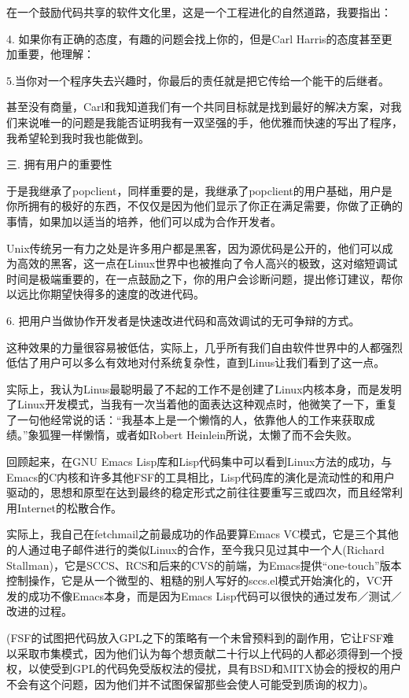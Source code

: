 \documentclass[a4paper,12pt,UTF8,twoside]{ctexbook}
\begin{document}
在一个鼓励代码共享的软件文化里，这是一个工程进化的自然道路，我要指出：

4. 如果你有正确的态度，有趣的问题会找上你的，但是Carl Harris的态度甚至更加重要，他理解：

5.当你对一个程序失去兴趣时，你最后的责任就是把它传给一个能干的后继者。


甚至没有商量，Carl和我知道我们有一个共同目标就是找到最好的解决方案，对我们来说唯一的问题是我能否证明我有一双坚强的手，他优雅而快速的写出了程序，我希望轮到我时我也能做到。

三. 拥有用户的重要性


于是我继承了popclient，同样重要的是，我继承了popclient的用户基础，用户是你所拥有的极好的东西，不仅仅是因为他们显示了你正在满足需要，你做了正确的事情，如果加以适当的培养，他们可以成为合作开发者。


Unix传统另一有力之处是许多用户都是黑客，因为源优码是公开的，他们可以成为高效的黑客，这一点在Linux世界中也被推向了令人高兴的极致，这对缩短调试时间是极端重要的，在一点鼓励之下，你的用户会诊断问题，提出修订建议，帮你以远比你期望快得多的速度的改进代码。


6. 把用户当做协作开发者是快速改进代码和高效调试的无可争辩的方式。


这种效果的力量很容易被低估，实际上，几乎所有我们自由软件世界中的人都强烈低估了用户可以多么有效地对付系统复杂性，直到Linus让我们看到了这一点。


实际上，我认为Linus最聪明最了不起的工作不是创建了Linux内核本身，而是发明了Linux开发模式，当我有一次当着他的面表达这种观点时，他微笑了一下，重复了一句他经常说的话：“我基本上是一个懒惰的人，依靠他人的工作来获取成绩。”象狐狸一样懒惰，或者如Robert Heinlein所说，太懒了而不会失败。


回顾起来，在GNU Emacs Lisp库和Lisp代码集中可以看到Linux方法的成功，与Emacs的C内核和许多其他FSF的工具相比，Lisp代码库的演化是流动性的和用户驱动的，思想和原型在达到最终的稳定形式之前往往要重写三或四次，而且经常利用Internet的松散合作。


实际上，我自己在fetchmail之前最成功的作品要算Emacs VC模式，它是三个其他的人通过电子邮件进行的类似Linux的合作，至今我只见过其中一个人(Richard Stallman)，它是SCCS、RCS和后来的CVS的前端，为Emacs提供“one-touch”版本控制操作，它是从一个微型的、粗糙的别人写好的sccs.el模式开始演化的，VC开发的成功不像Emacs本身，而是因为Emacs Lisp代码可以很快的通过发布／测试／改进的过程。


(FSF的试图把代码放入GPL之下的策略有一个未曾预料到的副作用，它让FSF难以采取市集模式，因为他们认为每个想贡献二十行以上代码的人都必须得到一个授权，以使受到GPL的代码免受版权法的侵扰，具有BSD和MITX协会的授权的用户不会有这个问题，因为他们并不试图保留那些会使人可能受到质询的权力)。
\end{document}
